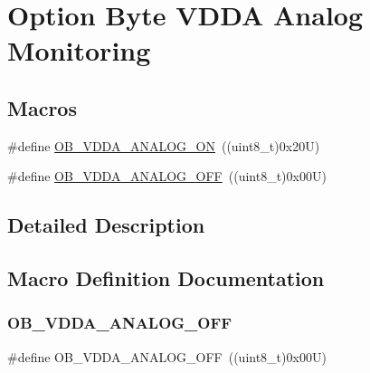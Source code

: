 \hypertarget{group___f_l_a_s_h_ex___o_b___v_d_d_a___analog___monitoring}{}\section{Option Byte V\+D\+DA Analog Monitoring}
\label{group___f_l_a_s_h_ex___o_b___v_d_d_a___analog___monitoring}
\subsection*{Macros}
\begin{DoxyCompactItemize}
\item 
\#define \hyperlink{group___f_l_a_s_h_ex___o_b___v_d_d_a___analog___monitoring_ga4761fde7c57b2b54ca9801daeb50c323}{O\+B\+\_\+\+V\+D\+D\+A\+\_\+\+A\+N\+A\+L\+O\+G\+\_\+\+ON}~((uint8\+\_\+t)0x20\+U)
\item 
\#define \hyperlink{group___f_l_a_s_h_ex___o_b___v_d_d_a___analog___monitoring_ga7c18e60ba77007074e6ac9b151a01b5e}{O\+B\+\_\+\+V\+D\+D\+A\+\_\+\+A\+N\+A\+L\+O\+G\+\_\+\+O\+FF}~((uint8\+\_\+t)0x00\+U)
\end{DoxyCompactItemize}


\subsection{Detailed Description}


\subsection{Macro Definition Documentation}
\mbox{\label{group___f_l_a_s_h_ex___o_b___v_d_d_a___analog___monitoring_ga7c18e60ba77007074e6ac9b151a01b5e}} 
\subsubsection{\texorpdfstring{O\+B\+\_\+\+V\+D\+D\+A\+\_\+\+A\+N\+A\+L\+O\+G\+\_\+\+O\+FF}{OB\_VDDA\_ANALOG\_OFF}}
{\footnotesize\ttfamily \#define O\+B\+\_\+\+V\+D\+D\+A\+\_\+\+A\+N\+A\+L\+O\+G\+\_\+\+O\+FF~((uint8\+\_\+t)0x00\+U)}

